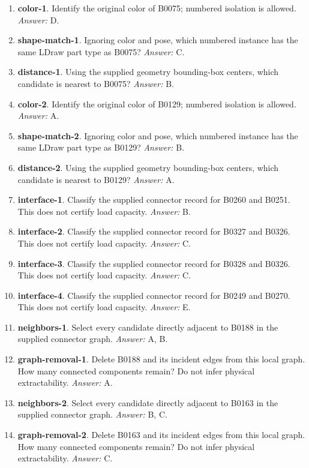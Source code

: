\begin{enumerate}
\item \textbf{color-1}. Identify the original color of B0075; numbered isolation is allowed. \textit{Answer:} D.
\item \textbf{shape-match-1}. Ignoring color and pose, which numbered instance has the same LDraw part type as B0075? \textit{Answer:} C.
\item \textbf{distance-1}. Using the supplied geometry bounding-box centers, which candidate is nearest to B0075? \textit{Answer:} B.
\item \textbf{color-2}. Identify the original color of B0129; numbered isolation is allowed. \textit{Answer:} A.
\item \textbf{shape-match-2}. Ignoring color and pose, which numbered instance has the same LDraw part type as B0129? \textit{Answer:} B.
\item \textbf{distance-2}. Using the supplied geometry bounding-box centers, which candidate is nearest to B0129? \textit{Answer:} A.
\item \textbf{interface-1}. Classify the supplied connector record for B0260 and B0251. This does not certify load capacity. \textit{Answer:} B.
\item \textbf{interface-2}. Classify the supplied connector record for B0327 and B0326. This does not certify load capacity. \textit{Answer:} C.
\item \textbf{interface-3}. Classify the supplied connector record for B0328 and B0326. This does not certify load capacity. \textit{Answer:} C.
\item \textbf{interface-4}. Classify the supplied connector record for B0249 and B0270. This does not certify load capacity. \textit{Answer:} E.
\item \textbf{neighbors-1}. Select every candidate directly adjacent to B0188 in the supplied connector graph. \textit{Answer:} A, B.
\item \textbf{graph-removal-1}. Delete B0188 and its incident edges from this local graph. How many connected components remain? Do not infer physical extractability. \textit{Answer:} A.
\item \textbf{neighbors-2}. Select every candidate directly adjacent to B0163 in the supplied connector graph. \textit{Answer:} B, C.
\item \textbf{graph-removal-2}. Delete B0163 and its incident edges from this local graph. How many connected components remain? Do not infer physical extractability. \textit{Answer:} C.

\end{enumerate}
